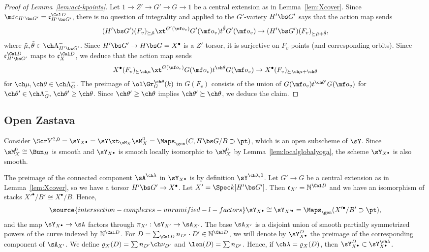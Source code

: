 \begin{proof}[{Proof of Lemma~\ref{lem:act-kpoints}}]
Let $1\to Z'\to G'\to G\to 1$ be a central extension as in Lemma~\ref{lem:Xcover}.
Since $\mf c_{H'\bs G'} = \mathfrak c^{\Cal D}_{H'\bs G'}$,
there is no question of integrality and \cite[Lemma 5.5.2]{SV}
applied to the $G'$-variety $H'\bs G'$ says that
the action map sends
\[ (H'\bs G')(F_v)_{\succeq \tilde\mu} \xt^{G'(\mf o_v)} G'(\mf o_v) t^{\tilde\theta} G'(\mf o_v) \to (H'\bs G')(F_v)_{\succeq \tilde\mu+\tilde\theta}, \]
where $\tilde\mu, \tilde\theta \in \ch\Lambda_{H'\bs G'}^-$.
Since $H'\bs G' \to H\bs G = X^\bullet$ is a $Z'$-torsor,
it is surjective on $F_v$-points (and corresponding orbits).
Since $\mathfrak c^{\Cal D}_{H'\bs G'}$ maps to $\mathfrak c_X^{\Cal D}$,
we deduce that the action map sends
\[ X^\bullet(F_v)_{\succeq \ch\mu} \xt^{G(\mf o_v)} G(\mf o_v) t^{\ch\theta} G(\mf o_v)
\to X^\bullet(F_v)_{\succeq \ch\mu+\ch\theta} \]
for $\ch\mu,\ch\theta \in \ch\Lambda^-_G$.
The preimage of $\ol\Gr^{\ch\theta}_G(k)$ in $G(F_v)$ consists of the union of
$G(\mf o_v) t^{\ch\theta'} G(\mf o_v)$ for $\ch\theta'\in \ch\Lambda^-_G,\,
\ch\theta' \ge \ch\theta$.
Since $\ch\theta' \ge \ch\theta$ implies $\ch\theta' \succeq \ch\theta$,
we deduce the claim.
\end{proof}



\subsection{Open Zastava} \label{sect:Y0cc}
Consider $\Scr Y^{?,0} = \sY_{X^\bullet}=\sY \xt_{\sM_X} \sM_X^0 = \Maps_\gen(C, H\bs G/B \supset \pt)$, which
is an open subscheme of $\sY$.
Since $\sM_X^0 \cong \Bun_H$ is smooth and $\sY_{X^\bullet}$ is smooth locally isomorphic to
$\sM_X^0$ by Lemma~\ref{lem:localglobalyoga}, the scheme $\sY_{X^\bullet}$ is also smooth.

The preimage of the connected component $\sA^{\ch\lambda}$ in $\sY_{X^\bullet}$
is by definition $\sY^{\ch\lambda,0}$.
Let $G' \to G$ be a central extension as in Lemma~\ref{lem:Xcover}, so
we have a torsor $H'\bs G' \to X^\bullet$.
Let $X' = \Spec k[H'\bs G']$.
Then $\mathfrak c_{X'} = \mathbb N^{\Cal D}$ and we have an isomorphism of stacks
$X'^\bullet / B' \cong  X^\bullet/ B$.
Hence,
\begin{equation}\label{e:YXprime}
\source{intersection-complexes-unramified-l-factors}
    \sY_{X^\bullet} \cong \sY_{X'^\bullet} = \Maps_\gen( X'^\bullet/B' \supset \pt ),
\end{equation}
and the map $\sY_{X^\bullet} \to \sA$ factors through $\pi_{X'} : \sY_{X'} \to \sA_{X'}$.
The base $\sA_{X'}$ is a disjoint union of smooth partially symmetrized powers of the curve indexed by $\mathbb N^{\Cal D}$.
 For $D = \sum_{\Cal D} n_{D'}\cdot D'\in \mathbb N^{\Cal D}$, we will denote by
$\sY_{X^\bullet}^D$ the preimage of the corresponding component of $\sA_{X'}$.
We define $\varrho_X(D) = \sum n_{D'}\ch\nu_{D'}$ and $\len(D) = \sum n_{D'}$. Hence, if $\ch\lambda = \varrho_X(D)$, then $\sY_{X^\bullet}^D \subset \sY_{X^\bullet}^{\ch\lambda}$.

